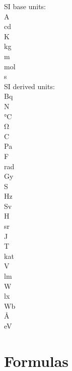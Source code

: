 \documentclass[hyperpdf,bindnopdf,twocolumn]{article}
\begin{document}
    SI base units:\\
    \si{\ampere}\\
    \si{\candela}\\
    \si{\kelvin}\\
    \si{\kilogram}\\
    \si{\meter }\\
    \si{\mole  }\\
    \si{\second}\\
    SI derived units:\\
    \si{\becquerel} \\
    \si{\newton}    \\
    \si{\degreeCelsius} \\
    \si{\ohm}       \\
    \si{\coulomb}   \\
    \si{\pascal}    \\
    \si{\farad}     \\
    \si{\radian}    \\
    \si{\gray}      \\
    \si{\siemens}   \\
    \si{\hertz}     \\
    \si{\sievert}   \\
    \si{\henry}     \\
    \si{\steradian} \\
    \si{\joule}     \\
    \si{\tesla}     \\
    \si{\katal}     \\
    \si{\volt}      \\
    \si{\lumen}     \\
    \si{\watt}      \\
    \si{\lux}       \\
    \si{\weber}     \\
    \si{\angstrom}     \\
    \si{\electronvolt}     \\


          
    \section{Formulas}
\end{document}
